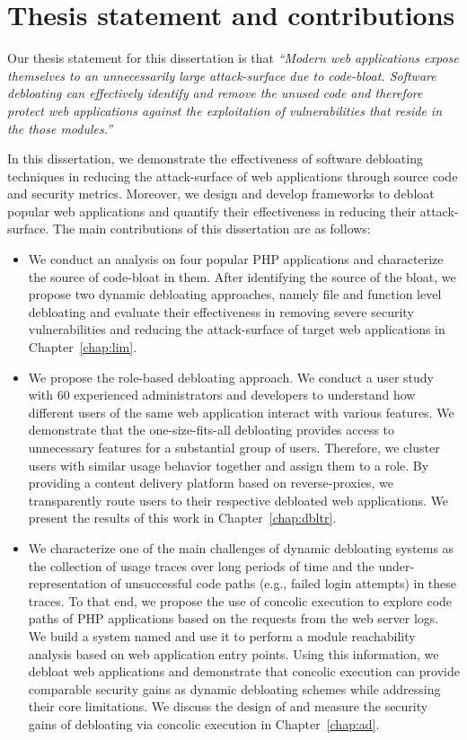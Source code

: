 \section{Thesis statement and contributions}

Our thesis statement for this dissertation is that \textit{``Modern web applications expose themselves to an unnecessarily large attack-surface due to code-bloat. Software debloating can effectively identify and remove the unused code and therefore protect web applications against the exploitation of vulnerabilities that reside in the those modules.''}

In this dissertation, we demonstrate the effectiveness of software debloating techniques in reducing the attack-surface of web applications through source code and security metrics. 
Moreover, we design and develop frameworks to debloat popular web applications and quantify their effectiveness in reducing their attack-surface. The main contributions of this dissertation are as follows:

\begin{itemize}
    \item We conduct an analysis on four popular PHP applications and characterize the source of code-bloat in them. After identifying the source of the bloat, we propose two dynamic debloating approaches, namely file and function level debloating and evaluate their effectiveness in removing severe security vulnerabilities and reducing the attack-surface of target web applications in Chapter~\ref{chap:lim}.
    \item We propose the role-based debloating approach. We conduct a user study with 60 experienced administrators and developers to understand how different users of the same web application interact with various features. We demonstrate that the one-size-fits-all debloating provides access to unnecessary features for a substantial group of users. Therefore, we cluster users with similar usage behavior together and assign them to a role. By providing a content delivery platform based on reverse-proxies, we transparently route users to their respective debloated web applications. We present the results of this work in Chapter~\ref{chap:dbltr}. 
    \item We characterize one of the main challenges of dynamic debloating systems as the collection of usage traces over long periods of time and the under-representation of unsuccessful code paths (e.g., failed login attempts) in these traces. To that end, we propose the use of concolic execution to explore code paths of PHP applications based on the requests from the web server logs. We build a system named \animatedead{} and use it to perform a module reachability analysis based on web application entry points. Using this information, we debloat web applications and demonstrate that concolic execution can provide comparable security gains as dynamic debloating schemes while addressing their core limitations. We discuss the design of \animatedead{} and measure the security gains of debloating via concolic execution in Chapter~\ref{chap:ad}.
\end{itemize}